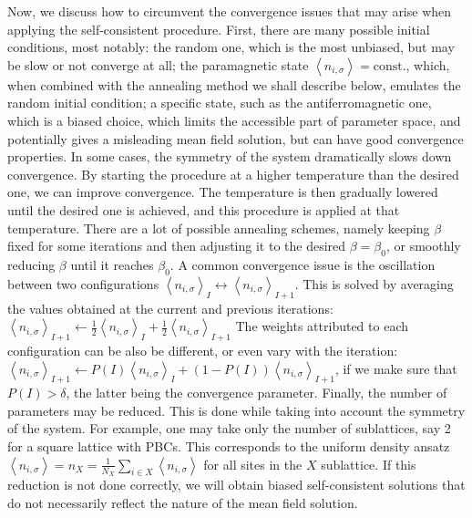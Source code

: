 Now, we discuss how to circumvent the convergence issues that may arise when applying the self-consistent procedure.
First, there are many possible initial conditions, most notably: the random one, which is the most unbiased, but may be slow or not converge at all; the paramagnetic state $\left\langle n_{i,\sigma} \right\rangle = \text{const.}$, which, when combined with the annealing method we shall describe below, emulates the random initial condition; a specific state, such as the antiferromagnetic one, which is a biased choice, which limits the accessible part of parameter space, and potentially gives a misleading mean field solution, but can have good convergence properties.
In some cases, the symmetry of the system dramatically slows down convergence.
By starting the procedure at a higher temperature than the desired one, we can improve convergence.
The temperature is then gradually lowered until the desired one is achieved, and this procedure is applied at that temperature.
There are a lot of possible annealing schemes, namely keeping $\beta$ fixed for some iterations and then adjusting it to the desired $\beta = \beta_0$, or smoothly reducing $\beta$ until it reaches $\beta_0$.
A common convergence issue is the oscillation between two configurations $\left\langle n_{i,\sigma}\right\rangle_I \leftrightarrow \left\langle n_{i,\sigma}\right\rangle_{I+1}$.
This is solved by averaging the values obtained at the current and previous iterations: $\left\langle n_{i,\sigma}\right\rangle_{I+1} \leftarrow \frac{1}{2} \left\langle n_{i,\sigma}\right\rangle_I + \frac{1}{2} \left\langle n_{i,\sigma}\right\rangle_{I+1}$
The weights attributed to each configuration can be also be different, or even vary with the iteration: $\left\langle n_{i,\sigma}\right\rangle_{I+1} \leftarrow P(I) \left\langle n_{i,\sigma}\right\rangle_I + (1 - P(I) ) \left\langle n_{i,\sigma}\right\rangle_{I+1}$, if we make sure that $P(I) > \delta$, the latter being the convergence parameter.
Finally, the number of parameters may be reduced.
This is done while taking into account the symmetry of the system.
For example, one may take only the number of sublattices, say 2 for a square lattice with \acp{PBC}.
This corresponds to the uniform density ansatz $\left\langle n_{i,\sigma} \right\rangle = n_X = \frac{1}{N_X} \sum_{i \in X} \left\langle n_{i,\sigma} \right\rangle$ for all sites in the $X$ sublattice.
If this reduction is not done correctly, we will obtain biased self-consistent solutions that do not necessarily reflect the nature of the mean field solution.